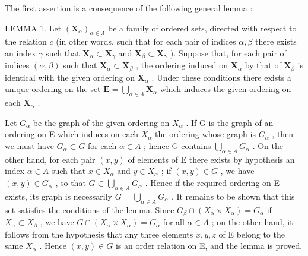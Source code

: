 The first assertion is a consequence of the following general lemma :

LEMMA 1. Let \((\mathbf{X}_{\alpha})_{\alpha \in \Lambda}\) be a family of ordered sets, directed with respect to the relation \(c\) (in other words, such that for each pair of indices \(\alpha, \beta\) there exists an index \(\gamma\) such that \(\mathbf{X}_{\alpha} \subset \mathbf{X}_{\gamma}\) and \(\mathbf{X}_{\beta} \subset \mathbf{X}_{\gamma}\) ). Suppose that, for each pair of indices \((\alpha, \beta)\) such that \(\mathbf{X}_{\alpha} \subset \mathbf{X}_{\beta}\) , the ordering induced on \(\mathbf{X}_{\alpha}\) by that of \(\mathbf{X}_{\beta}\) is identical with the given ordering on \(\mathbf{X}_{\alpha}\) . Under these conditions there exists a unique ordering on the set \(\mathbf{E} = \bigcup_{\alpha \in \Lambda} \mathbf{X}_{\alpha}\) which induces the given ordering on each \(\mathbf{X}_{\alpha}\) .

Let \(G_{\alpha}\) be the graph of the given ordering on \(X_{\alpha}\) . If G is the graph of an ordering on E which induces on each \(X_{\alpha}\) the ordering whose graph is \(G_{\alpha}\) , then we must have \(G_{\alpha} \subset G\) for each \(\alpha \in A\) ; hence G contains \(\bigcup_{\alpha \in A} G_{\alpha}\) . On the other hand, for each pair \((x, y)\) of elements of E there exists by hypothesis an index \(\alpha \in A\) such that \(x \in X_{\alpha}\) and \(y \in X_{\alpha}\) ; if \((x, y) \in G\) , we have \((x, y) \in G_{\alpha}\) , so that \(G \subset \bigcup_{\alpha \in A} G_{\alpha}\) . Hence if the required ordering on E exists, its graph is necessarily \(G = \bigcup_{\alpha \in A} G_{\alpha}\) . It remains to be shown that this set satisfies the conditions of the lemma. Since \(G_{\beta} \cap (X_{\alpha} \times X_{\alpha}) = G_{\alpha}\) if \(X_{\alpha} \subset X_{\beta}\) , we have \(G \cap (X_{\alpha} \times X_{\alpha}) = G_{\alpha}\) for all \(\alpha \in A\) ; on the other hand, it follows from the hypothesis that any three elements \(x, y, z\) of E belong to the same \(X_{\alpha}\) . Hence \((x, y) \in G\) is an order relation on E, and the lemma is proved.


